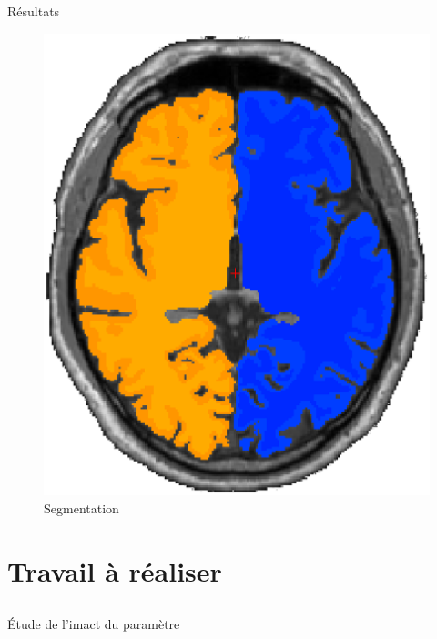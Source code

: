 \documentclass{beamer}
\begin{document}
\begin{frame}[t]{Résultats}
  \begin{figure}
    \includegraphics[scale=0.3]{annex/segmentation}
    \caption{Segmentation}
    \label{seg}
  \end{figure}
\end{frame}

\section{Travail à réaliser}

\subsection*{}

\begin{frame}[t]{\'Etude de l'imact du paramètre}

\end{frame}
\end{document}
